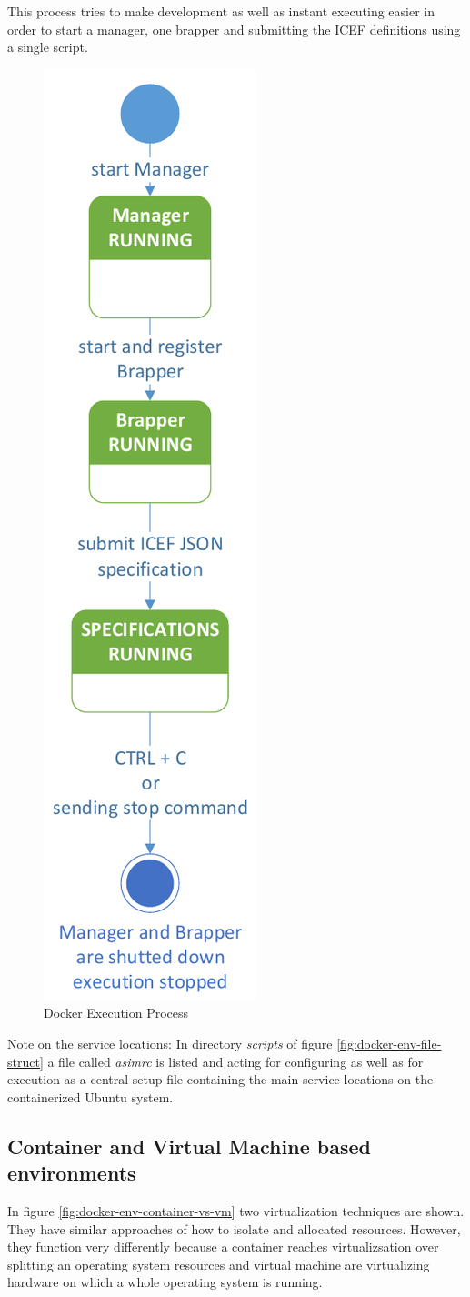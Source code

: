 This process tries to make development as well as instant executing easier in order to start a manager, one brapper and submitting the ICEF definitions using a single script.

\begin{figure}[htbp]
  \centering
  \includegraphics[height=0.9\textwidth, clip, trim=1mm 1mm 1mm 1mm]{Figures/docker_execute}
  \caption{Docker Execution Process}
  \label{fig:docker-env-exec-process}
\end{figure}

Note on the service locations: In directory \textit{scripts} of figure \ref{fig:docker-env-file-struct} a file called \textit{asimrc} is listed and acting for configuring as well as for execution as a central setup file containing the main service locations on the containerized Ubuntu system.

\subsection{Container and Virtual Machine based environments}

In figure \ref{fig:docker-env-container-vs-vm} two virtualization techniques are shown. They have similar approaches of how to isolate and allocated resources. However, they function very differently because a container reaches virtualizsation over splitting an operating system resources and virtual machine are virtualizing hardware on which a whole operating system is running.

